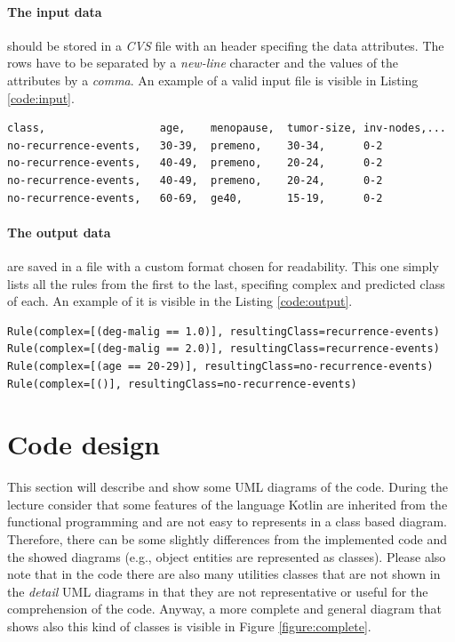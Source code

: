 \documentclass{article}
\begin{document}
\paragraph{The input data} should be stored in a \textit{CVS} file with an header specifing the data attributes. The rows have to be separated by a \textit{new-line} character and the values of the attributes by a \textit{comma}. An example of a valid input file is visible in Listing \ref{code:input}.
\vspace{8pt}
\begin{lstlisting}[caption={A valid data input file},captionpos=b,label={code:input}]
class,                  age,    menopause,  tumor-size, inv-nodes,...
no-recurrence-events,   30-39,  premeno,    30-34,      0-2
no-recurrence-events,   40-49,  premeno,    20-24,      0-2
no-recurrence-events,   40-49,  premeno,    20-24,      0-2
no-recurrence-events,   60-69,  ge40,       15-19,      0-2
\end{lstlisting}

\paragraph{The output data} are saved in a file with a custom format chosen for readability. This one simply lists all the rules from the first to the last, specifing complex and predicted class of each. An example of it is visible in the Listing \ref{code:output}.
\vspace{8pt}
\begin{lstlisting}[caption={The format of the decision list saved to an output file},captionpos=b,label={code:output}]
Rule(complex=[(deg-malig == 1.0)], resultingClass=recurrence-events)
Rule(complex=[(deg-malig == 2.0)], resultingClass=recurrence-events)
Rule(complex=[(age == 20-29)], resultingClass=no-recurrence-events)
Rule(complex=[()], resultingClass=no-recurrence-events)
\end{lstlisting}
\newpage


\section{Code design}
This section will describe and show some UML diagrams of the code. During the lecture consider that some features of the language Kotlin are inherited from the functional programming and are not easy to represents in a class based diagram. Therefore, there can be some slightly differences from the implemented code and the showed diagrams (e.g., object entities are represented as classes).
\vspace{12pt}\newline
Please also note that in the code there are also many utilities classes that are not shown in the \textit{detail} UML diagrams in that they are not representative or useful for the comprehension of the code. Anyway, a more complete and general diagram that shows also this kind of classes is visible in Figure \ref{figure:complete}.
\end{document}
